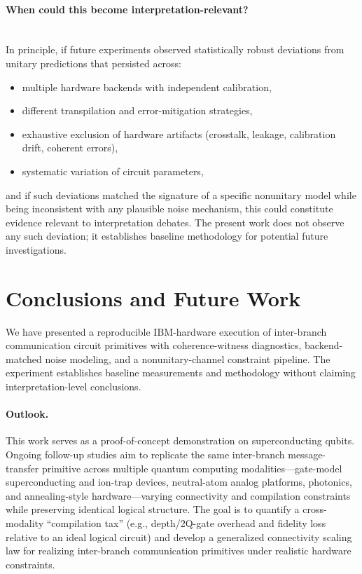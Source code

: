 \documentclass[11pt]{article}
\begin{document}
\vspace{8pt}

\paragraph{When could this become interpretation-relevant?}\mbox{}\\[0.6\baselineskip]
In principle, if future experiments observed statistically robust deviations from unitary predictions that persisted across:

\begin{itemize}
    \item multiple hardware backends with independent calibration,
    \item different transpilation and error-mitigation strategies,
    \item exhaustive exclusion of hardware artifacts (crosstalk, leakage, calibration drift, coherent errors),
    \item systematic variation of circuit parameters,
\end{itemize}
and if such deviations matched the signature of a specific nonunitary model while being inconsistent with any plausible noise mechanism, this could constitute evidence relevant to interpretation debates. The present work does not observe any such deviation; it establishes baseline methodology for potential future investigations.

\section{Conclusions and Future Work}
\label{sec:conclusion}

We have presented a reproducible IBM-hardware execution of inter-branch communication circuit primitives with coherence-witness diagnostics, backend-matched noise modeling, and a nonunitary-channel constraint pipeline. The experiment establishes baseline measurements and methodology without claiming interpretation-level conclusions.

\paragraph{Outlook.} 
This work serves as a proof-of-concept demonstration on superconducting qubits. Ongoing follow-up studies aim to replicate the same inter-branch message-transfer primitive across multiple quantum computing modalities---gate-model superconducting and ion-trap devices, neutral-atom analog platforms, photonics, and annealing-style hardware---varying connectivity and compilation constraints while preserving identical logical structure. The goal is to quantify a cross-modality ``compilation tax'' (e.g., depth/2Q-gate overhead and fidelity loss relative to an ideal logical circuit) and develop a generalized connectivity scaling law for realizing inter-branch communication primitives under realistic hardware constraints.
\end{document}
